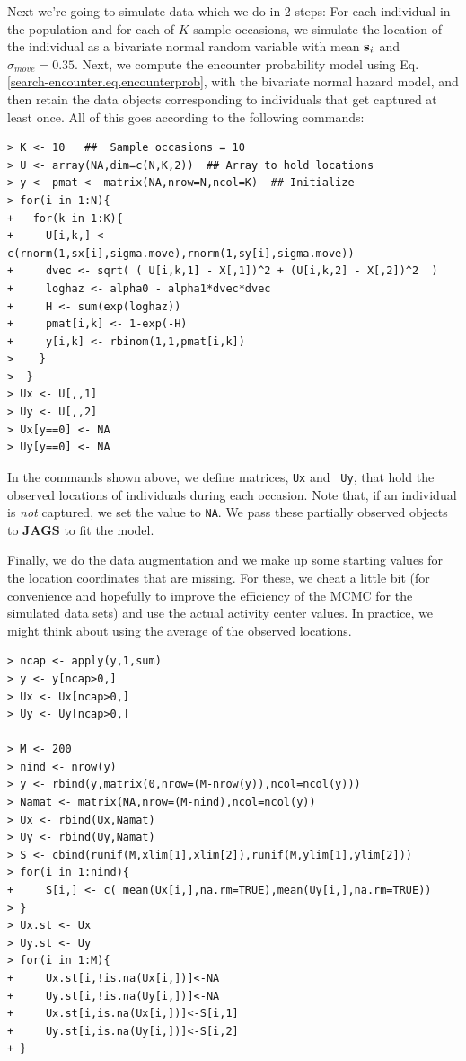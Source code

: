 Next we're going to simulate data which we do in 2 steps:
For each individual in the population and for each of $K$ sample
occasions, we simulate the location of the individual as a bivariate
normal random variable with mean ${\bf s}_i$ and $\sigma_{move} = 0.35$.
 Next, we compute the encounter
probability model using Eq. \ref{search-encounter.eq.encounterprob},
with the bivariate normal hazard model, and then retain the data
objects corresponding to individuals that get captured at least
once. All of this goes according to the following commands:
{\small
\begin{verbatim}
> K <- 10   ##  Sample occasions = 10
> U <- array(NA,dim=c(N,K,2))  ## Array to hold locations
> y <- pmat <- matrix(NA,nrow=N,ncol=K)  ## Initialize
> for(i in 1:N){
+   for(k in 1:K){
+     U[i,k,] <- c(rnorm(1,sx[i],sigma.move),rnorm(1,sy[i],sigma.move))
+     dvec <- sqrt( ( U[i,k,1] - X[,1])^2 + (U[i,k,2] - X[,2])^2  )
+     loghaz <- alpha0 - alpha1*dvec*dvec
+     H <- sum(exp(loghaz))
+     pmat[i,k] <- 1-exp(-H)
+     y[i,k] <- rbinom(1,1,pmat[i,k])
>    }
>  }
> Ux <- U[,,1]
> Uy <- U[,,2]
> Ux[y==0] <- NA
> Uy[y==0] <- NA
\end{verbatim}
}
{\flushleft
In the} commands shown above, we define matrices, \mbox{\tt Ux} and \mbox{\tt
  Uy}, that hold the observed locations of individuals during each
occasion. Note that, if an individual is {\it not} captured, we set
the value to \mbox{\tt NA}. We pass these partially observed objects
to {\bf JAGS} to fit the model.

Finally, we do the data augmentation and we make up some starting
values for the location coordinates that are missing.  For these, we
cheat a little bit (for convenience and hopefully to improve the
efficiency of the MCMC for the simulated data sets) and use the actual
activity center values. In practice, we might think about using the
average of the observed locations.  {\small
\begin{verbatim}
> ncap <- apply(y,1,sum)
> y <- y[ncap>0,]
> Ux <- Ux[ncap>0,]
> Uy <- Uy[ncap>0,]

> M <- 200
> nind <- nrow(y)
> y <- rbind(y,matrix(0,nrow=(M-nrow(y)),ncol=ncol(y)))
> Namat <- matrix(NA,nrow=(M-nind),ncol=ncol(y))
> Ux <- rbind(Ux,Namat)
> Uy <- rbind(Uy,Namat)
> S <- cbind(runif(M,xlim[1],xlim[2]),runif(M,ylim[1],ylim[2]))
> for(i in 1:nind){
+     S[i,] <- c( mean(Ux[i,],na.rm=TRUE),mean(Uy[i,],na.rm=TRUE))
> }
> Ux.st <- Ux
> Uy.st <- Uy
> for(i in 1:M){
+     Ux.st[i,!is.na(Ux[i,])]<-NA
+     Uy.st[i,!is.na(Uy[i,])]<-NA
+     Ux.st[i,is.na(Ux[i,])]<-S[i,1]
+     Uy.st[i,is.na(Uy[i,])]<-S[i,2]
+ }
\end{verbatim}
}

